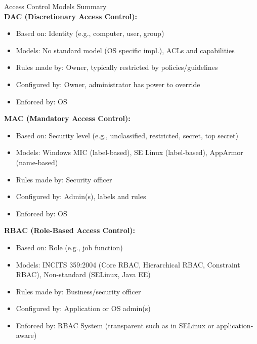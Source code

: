 \begin{theorem}{Access Control Models Summary}\\
    
    \textbf{DAC (Discretionary Access Control):}
    \begin{itemize}
        \item Based on: Identity (e.g., computer, user, group)
        \item Models: No standard model (OS specific impl.), ACLs and capabilities
        \item Rules made by: Owner, typically restricted by policies/guidelines
        \item Configured by: Owner, administrator has power to override
        \item Enforced by: OS
    \end{itemize}
    
    \textbf{MAC (Mandatory Access Control):}
    \begin{itemize}
        \item Based on: Security level (e.g., unclassified, restricted, secret, top secret)
        \item Models: Windows MIC (label-based), SE Linux (label-based), AppArmor (name-based)
        \item Rules made by: Security officer
        \item Configured by: Admin(s), labels and rules
        \item Enforced by: OS
    \end{itemize}
    
    \textbf{RBAC (Role-Based Access Control):}
    \begin{itemize}
        \item Based on: Role (e.g., job function)
        \item Models: INCITS 359:2004 (Core RBAC, Hierarchical RBAC, Constraint RBAC), Non-standard (SELinux, Java EE)
        \item Rules made by: Business/security officer
        \item Configured by: Application or OS admin(s)
        \item Enforced by: RBAC System (transparent such as in SELinux or application-aware)
    \end{itemize}
\end{theorem}